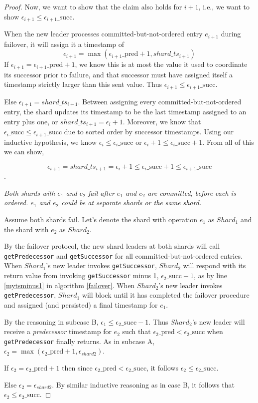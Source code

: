 \begin{proof}
Now, we want to show that the claim also holds for $i+1$, i.e., we want to show $\epsilon_{i+1} \leq \epsilon_{i+1}\_\text{succ}$.

When the new leader processes committed-but-not-ordered entry $e_{i+1}$ during failover, it will assign it a timestamp of
$$\epsilon_{i+1} = \max(\epsilon_{i+1}\_\text{pred} + 1, shard\_ts_{i+1})$$
If $\epsilon_{i+1} = \epsilon_{i+1}\_\text{pred} + 1$, we know this is at most the value it used to coordinate its successor prior to failure, and that successor must have assigned itself a timestamp strictly larger than this sent value. Thus $\epsilon_{i+1} \leq \epsilon_{i+1}\_\text{succ}$.

Else $\epsilon_{i+1} = shard\_ts_{i+1}$. Between assigning every committed-but-not-ordered entry, the shard updates its timestamp to be the last timestamp assigned to an entry plus one, or $shard\_ts_{i+1} = \epsilon_i + 1$. Moreover, we know that $\epsilon_{i}\_\text{succ} \leq \epsilon_{i+1}\_\text{succ}$ due to sorted order by successor timestamps. Using our inductive hypothesis, we know $\epsilon_i \leq \epsilon_i\_\text{succ}$ or $\epsilon_i + 1 \leq \epsilon_i\_\text{succ}+1$. From all of this we can show,

$$\epsilon_{i+1} = shard\_ts_{i+1} = \epsilon_i + 1 \leq \epsilon_i\_\text{succ} + 1 \leq \epsilon_{i+1}\_\text{succ}$$.

 \textit{Both shards with $e_1$ and $e_2$ fail after $e_1$ and $e_2$ are \textit{committed}, before each is \textit{ordered}. $e_1$ and $e_2$ could be at separate shards or the same shard.}

Assume both shards fail. Let's denote the shard with operation $e_1$ as $Shard_1$ and the shard with $e_2$ as $Shard_2$.

By the failover protocol, the new shard leaders at both shards will call \texttt{getPredecessor} and \texttt{getSuccessor} for all committed-but-not-ordered entries. When $Shard_1$'s new leader invokes \texttt{getSuccessor}, $Shard_2$ will respond with its return value from invoking \texttt{getSuccessor} minus 1, $\epsilon_2\_\text{succ} - 1$, as by line \ref{mytsminus1} in algorithm \ref{failover}. When $Shard_2$'s new leader invokes \texttt{getPredecessor}, $Shard_1$ will block until it has completed the failover procedure and assigned (and persisted) a final timestamp for $e_1$. 

By the reasoning in subcase B, $\epsilon_1 \leq \epsilon_2\_\text{succ} - 1$. Thus $Shard_2$'s new leader will receive a \textit{predecessor} timestamp for $e_2$ such that $\epsilon_2\_\text{pred} < \epsilon_2\_\text{succ}$ when \texttt{getPredecessor} finally returns. As in subcase A, $\epsilon_2 = \max(\epsilon_2\_\text{pred}+1, \epsilon_{shard2})$.

If $\epsilon_2 = \epsilon_2\_\text{pred}+1$ then since $\epsilon_2\_\text{pred} < \epsilon_2\_\text{succ}$, it follows $\epsilon_2 \leq \epsilon_2\_\text{succ}$.

Else $\epsilon_2 = \epsilon_{shard2}$. By similar inductive reasoning as in case B, it follows that $\epsilon_2 \leq \epsilon_2\_\text{succ}$.
\end{proof}

